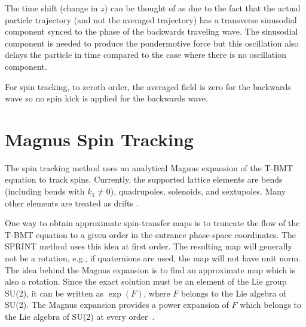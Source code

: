 The time shift (change in $z$) can be thought of as due to the fact that the actual particle
trajectory (and not the averaged trajectory) has a transverse sinusodial component synced to the
phase of the backwards traveling wave. The sinusodial component is needed to produce the
pondermotive force but this oscillation also delays the particle in time compared to the case where
there is no oscillation component.

For spin tracking, to zeroth order, the averaged field is zero for the backwards wave so no spin
kick is applied for the backwards wave.

\section{Magnus Spin Tracking}
\label{s:magnus}

The  spin tracking method uses an analytical Magnus expansion of the T-BMT equation to
track spins.  Currently, the supported lattice elements are bends (including bends with $k_1 \neq
0$), quadrupoles, solenoids, and sextupoles.  Many other elements are treated as drifts
.

One way to obtain approximate spin-transfer maps is to truncate the flow of the T-BMT equation to a
given order in the entrance phase-space coordinates.  The SPRINT method  uses
this idea at first order. The resulting map will generally not be a rotation, e.g., if quaternions
are used, the map will not have unit norm. The idea behind the Magnus expansion is to find an
approximate map which is also a rotation. Since the exact solution must be an element of the Lie
group SU(2), it can be written as $\exp(F)$, where $F$ belongs to the Lie algebra of SU(2). The
Magnus expansion provides a power expansion of $F$ which belongs to the Lie algebra of SU(2) at
every order~\cite{b:magnus}.

